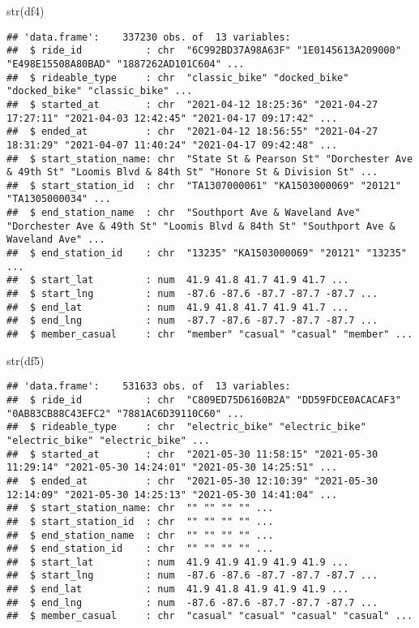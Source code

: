 \documentclass[
]{article}
\newenvironment{Shaded}{\begin{snugshade}}{\end{snugshade}}
\newcommand{\FunctionTok}[1]{\textcolor[rgb]{0.00,0.00,0.00}{#1}}
\newcommand{\NormalTok}[1]{#1}
\begin{document}
\begin{Shaded}
\begin{Highlighting}[]
\FunctionTok{str}\NormalTok{(df4)}
\end{Highlighting}
\end{Shaded}

\begin{verbatim}
## 'data.frame':    337230 obs. of  13 variables:
##  $ ride_id           : chr  "6C992BD37A98A63F" "1E0145613A209000" "E498E15508A80BAD" "1887262AD101C604" ...
##  $ rideable_type     : chr  "classic_bike" "docked_bike" "docked_bike" "classic_bike" ...
##  $ started_at        : chr  "2021-04-12 18:25:36" "2021-04-27 17:27:11" "2021-04-03 12:42:45" "2021-04-17 09:17:42" ...
##  $ ended_at          : chr  "2021-04-12 18:56:55" "2021-04-27 18:31:29" "2021-04-07 11:40:24" "2021-04-17 09:42:48" ...
##  $ start_station_name: chr  "State St & Pearson St" "Dorchester Ave & 49th St" "Loomis Blvd & 84th St" "Honore St & Division St" ...
##  $ start_station_id  : chr  "TA1307000061" "KA1503000069" "20121" "TA1305000034" ...
##  $ end_station_name  : chr  "Southport Ave & Waveland Ave" "Dorchester Ave & 49th St" "Loomis Blvd & 84th St" "Southport Ave & Waveland Ave" ...
##  $ end_station_id    : chr  "13235" "KA1503000069" "20121" "13235" ...
##  $ start_lat         : num  41.9 41.8 41.7 41.9 41.7 ...
##  $ start_lng         : num  -87.6 -87.6 -87.7 -87.7 -87.7 ...
##  $ end_lat           : num  41.9 41.8 41.7 41.9 41.7 ...
##  $ end_lng           : num  -87.7 -87.6 -87.7 -87.7 -87.7 ...
##  $ member_casual     : chr  "member" "casual" "casual" "member" ...
\end{verbatim}

\begin{Shaded}
\begin{Highlighting}[]
\FunctionTok{str}\NormalTok{(df5)}
\end{Highlighting}
\end{Shaded}

\begin{verbatim}
## 'data.frame':    531633 obs. of  13 variables:
##  $ ride_id           : chr  "C809ED75D6160B2A" "DD59FDCE0ACACAF3" "0AB83CB88C43EFC2" "7881AC6D39110C60" ...
##  $ rideable_type     : chr  "electric_bike" "electric_bike" "electric_bike" "electric_bike" ...
##  $ started_at        : chr  "2021-05-30 11:58:15" "2021-05-30 11:29:14" "2021-05-30 14:24:01" "2021-05-30 14:25:51" ...
##  $ ended_at          : chr  "2021-05-30 12:10:39" "2021-05-30 12:14:09" "2021-05-30 14:25:13" "2021-05-30 14:41:04" ...
##  $ start_station_name: chr  "" "" "" "" ...
##  $ start_station_id  : chr  "" "" "" "" ...
##  $ end_station_name  : chr  "" "" "" "" ...
##  $ end_station_id    : chr  "" "" "" "" ...
##  $ start_lat         : num  41.9 41.9 41.9 41.9 41.9 ...
##  $ start_lng         : num  -87.6 -87.6 -87.7 -87.7 -87.7 ...
##  $ end_lat           : num  41.9 41.8 41.9 41.9 41.9 ...
##  $ end_lng           : num  -87.6 -87.6 -87.7 -87.7 -87.7 ...
##  $ member_casual     : chr  "casual" "casual" "casual" "casual" ...
\end{verbatim}
\end{document}
